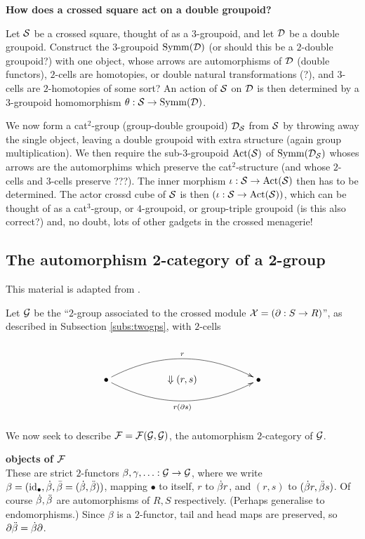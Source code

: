 \bigskip\noindent 
{\bf How does a crossed square act on a double groupoid?} 

Let $\mathcal{S}$ be a crossed square, thought of as a $3$-groupoid, 
and let $\mathcal{D}$ be a double groupoid. 
Construct the $3$-groupoid $\mathrm{Symm}(\mathcal{D})$ 
(or should this be a $2$-double groupoid?)
with one object, whose arrows are automorphisms of $\mathcal{D}$ (double functors), 
$2$-cells are homotopies, or double natural transformations (?), 
and $3$-cells are $2$-homotopies of some sort? 
An action of $\mathcal{S}$ on $\mathcal{D}$ is then determined by a 
$3$-groupoid homomorphism $\theta : \mathcal{S} \to \mathrm{Symm}(\mathcal{D})$.

We now form a cat$^2$-group (group-double groupoid) 
$\mathcal{D}_{\mathcal{S}}$ from $\mathcal{S}$ by throwing away the single object, 
leaving a double groupoid with extra structure (again group multiplication).
We then require the sub-$3$-groupoid $\mathrm{Act}(\mathcal{S})$ 
of $\mathrm{Symm}(\mathcal{D}_{\mathcal{S}})$ whoses arrows 
are the automorphims which preserve the cat$^2$-structure 
(and whose $2$-cells and $3$-cells preserve ???). 
The inner morphism $\iota : \mathcal{S} \to \mathrm{Act}(\mathcal{S})$ then has to be determined.  
The actor crossd cube of $\mathcal{S}$ is then 
$(\iota : \mathcal{S} \to \mathrm{Act}(\mathcal{S}))$, 
which can be thought of as a cat$^3$-group, 
or $4$-groupoid, or group-triple groupoid (is this also correct?) 
and, no doubt, lots of other gadgets in the crossed menagerie!


\newpage
\subsection{The automorphism 2-category of a 2-group}

This material is adapted from \cite{kamps:port}.

Let $\mathcal{G}$ be the ``$2$-group associated to the crossed module 
$\mathcal{X} = (\partial : S \to R)$'', 
as described in Subsection \ref{subs:twogps}, 
with $2$-cells

$$
\xy
\xymatrix{
  && && \\
  \bullet  \ar@/^5ex/[rrrr]^{r} 
           \ar@/_5ex/[rrrr]_{r(\partial s)} 
  && \Downarrow (r,s)
     && \bullet \\
  && && \\
}
\endxy
$$

\medskip\noindent
We now seek to describe $\mathcal{F} = \mathcal{F}(\mathcal{G},\mathcal{G})$, 
the automorphism $2$-category of $\mathcal{G}$.

\medskip\noindent
{\large{\bf objects of $\mathcal{F}$}}\\ 
These are strict $2$-functors $\beta,\gamma,\ldots : \mathcal{G} \to \mathcal{G}$, 
where we write $\beta = (\mathrm{id}_{\bullet},\dot{\beta}, \bar{\beta}=(\dot{\beta},\ddot{\beta}))$, 
mapping $\bullet$ to itself, $r$ to $\dot{\beta} r$, 
and $(r,s)$ to $(\dot{\beta} r, \ddot{\beta} s)$. 
Of course $\dot{\beta},\ddot{\beta}$ are automorphisms of $R,S$ respectively. 
(Perhaps generalise to endomorphisms.)
Since $\beta$ is a $2$-functor, tail and head maps are preserved, 
so $\partial\ddot{\beta} = \dot{\beta}\partial$.

